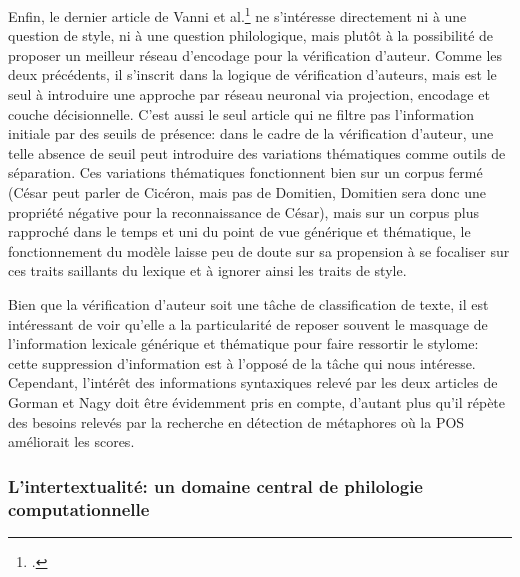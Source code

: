 Enfin, le dernier article de Vanni et al.\footcite{vanni_textual_2018} ne s'intéresse directement ni à une question de style, ni à une question philologique, mais plutôt à la possibilité de proposer un meilleur réseau d'encodage pour la vérification d'auteur. Comme les deux précédents, il s'inscrit dans la logique de vérification d'auteurs, mais est le seul à introduire une approche par réseau neuronal via projection, encodage et couche décisionnelle. C'est aussi le seul article qui ne filtre pas l'information initiale par des seuils de présence: dans le cadre de la vérification d'auteur, une telle absence de seuil peut introduire des variations thématiques comme outils de séparation. Ces variations thématiques fonctionnent bien sur un corpus fermé (César peut parler de Cicéron, mais pas de Domitien, Domitien sera donc une propriété négative pour la reconnaissance de César), mais sur un corpus plus rapproché dans le temps et uni du point de vue générique et thématique, le fonctionnement du modèle laisse peu de doute sur sa propension à se focaliser sur ces traits saillants du lexique et à ignorer ainsi les traits de style.

Bien que la vérification d'auteur soit une tâche de classification de texte, il est intéressant de voir qu'elle a la particularité de reposer souvent le masquage de l'information lexicale générique et thématique pour faire ressortir le stylome: cette suppression d'information est à l'opposé de la tâche qui nous intéresse. Cependant, l'intérêt des informations syntaxiques relevé par les deux articles de Gorman et Nagy doit être évidemment pris en compte, d'autant plus qu'il répète des besoins relevés par la recherche en détection de métaphores où la POS améliorait les scores.

\subsubsection{L'intertextualité: un domaine central de philologie computationnelle}


